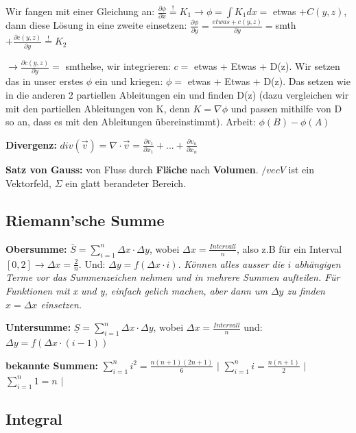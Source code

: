 \documentclass[a3paper, ngerman, 8pt]{article}
\newcommand{\mbeq}{\overset{!}{=}}
\begin{document}
\begin{multicols*}{3}
Wir fangen mit einer Gleichung an: $\frac{\partial\phi}{\partial x}\mbeq K_1 \to \phi = \int K_1 dx = $ etwas $+C(y,z)$, dann diese Lösung in eine zweite einsetzen: $\frac{\partial\phi}{\partial y}=\frac{etwas + c(y,z)}{\partial y}= $smth$ + \frac{\partial c(y,z)}{\partial y} \mbeq K_2 $

$\to \frac{\partial c(y,z)}{\partial y} =$ smthelse, wir integrieren: $c=$ etwas + Etwas + D(z). Wir setzen das in unser erstes $\phi$ ein und kriegen: $\phi =$ etwas + Etwas + D(z). Das setzen wie in die anderen 2 partiellen Ableitungen ein und finden D(z) (dazu vergleichen wir mit den partiellen Ableitungen von K, denn $K=\nabla \phi$ und passen mithilfe von D so an, dass es mit den Ableitungen übereinstimmt). Arbeit: $\phi (B)-\phi(A)$


\textbf{Divergenz:} $div(\vec{v})=\nabla \cdot \vec{v}=\frac{\partial v_1}{\partial x_1}+...+\frac{\partial v_n}{\partial x_n}$

\textbf{Satz von Gauss:}  von Fluss durch \textbf{Fläche} nach \textbf{Volumen}. $/vec{V}$ ist ein Vektorfeld, $\Sigma$ ein glatt berandeter Bereich.

\subsection*{Riemann'sche Summe}
\textbf{Obersumme:} $\bar{S}=\sum_{i=1}^{n} \Delta x \cdot \Delta y$, wobei $\Delta x = \frac{Intervall}{n}$, also z.B für ein Interval $[0,2] \to \Delta x = \frac{2}{n}$. Und: $\Delta y = f(\Delta x \cdot i)$.
\textit{Können alles ausser die $i$ abhängigen Terme vor das Summenzeichen nehmen und in mehrere Summen aufteilen. Für Funktionen mit x und y, einfach gelich machen, aber dann um $\Delta y$ zu finden $x=\Delta x$ einsetzen.}

\textbf{Untersumme:} $\underline{S}=\sum_{i=1}^{n} \Delta x \cdot \Delta y$, wobei $\Delta x = \frac{Intervall}{n}$ und: $\Delta y = f(\Delta x \cdot (i-1))$


\textbf{bekannte Summen:} $\sum_{i=1}^{n} i^2 = \frac{n(n+1)(2n+1)}{6}$ $\big \vert$ $\sum_{i=1}^{n} i = \frac{n(n+1)}{2}$  $\big \vert$ $\sum_{i=1}^{n} 1=n$ $\big \vert$ 

\subsection*{Integral}


\end{multicols*}
\end{document}

